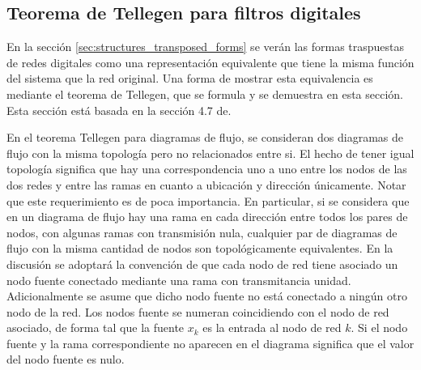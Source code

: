 \documentclass[a4paper]{report}
\begin{document}
\subsection{Teorema de Tellegen para filtros digitales}\label{sec:structures_tellegen_theorem}

En la sección \ref{sec:structures_transposed_forms} se verán las formas traspuestas de redes digitales como una representación equivalente que tiene la misma función del sistema que la red original. Una forma de mostrar esta equivalencia es mediante el teorema de Tellegen, que se formula y se demuestra en esta sección. Esta sección está basada en la sección 4.7 de\cite{oppenheim75digital}.

En el teorema Tellegen para diagramas de flujo, se consideran dos diagramas de flujo con la misma topología pero no relacionados entre si. El hecho de tener igual topología significa que hay una correspondencia uno a uno entre los nodos de las dos redes y entre las ramas en cuanto a ubicación y dirección únicamente. Notar que este requerimiento es de poca importancia. En particular, si se considera que en un diagrama  de flujo hay una rama en cada  dirección entre todos los pares de nodos, con algunas ramas con transmisión nula, cualquier par de diagramas de flujo con la misma cantidad de nodos son topológicamente equivalentes. En la discusión se adoptará la convención de que cada nodo de red tiene asociado un nodo fuente conectado mediante una rama con transmitancia unidad. Adicionalmente se asume que dicho nodo fuente no está conectado a ningún otro nodo de la red. Los nodos fuente se numeran coincidiendo con el nodo de red asociado, de forma tal que la fuente \(x_k\) es la entrada al nodo de red \(k\). Si el nodo fuente y la rama correspondiente no aparecen en el diagrama significa que el valor del nodo fuente es nulo.
\end{document}
